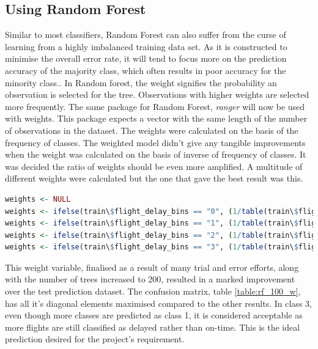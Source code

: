 \subsection{Using Random Forest}
Similar to most classifiers, Random Forest can also suffer from the curse of learning from a highly imbalanced training data set. As it is constructed to minimise the overall error rate, it will tend to focus more on the prediction accuracy of the majority class, which often results in poor accuracy for the minority class.\cite{Chen2004UsingDatab}. In Random forest, the weight signifies the probability an observation is selected for the tree. Observations with higher weights are selected more frequently. The same package for Random Forest, \textit{ranger} will now be used with weights. This package expects a vector with the same length of the number of observations in the dataset. The weights were calculated on the basis of the frequency of classes. The weighted model didn't give any tangible improvements when the weight was calculated on the basis of inverse of frequency of classes. It was decided the ratio of weights should be even more amplified. A multitude of different weights were calculated but the one that gave the best result was this. 
    
\begin{lstlisting}[language=R, breaklines=true]
weights <- NULL
weights <- ifelse(train\$flight_delay_bins == "0", (1/table(train\$flight_delay_bins)[1]) * 0.10, 0)
weights <- ifelse(train\$flight_delay_bins == "1", (1/table(train\$flight_delay_bins)[2]) * 0.20, weights)
weights <- ifelse(train\$flight_delay_bins == "2", (1/table(train\$flight_delay_bins)[3]) * 0.30 , weights)
weights <- ifelse(train\$flight_delay_bins == "3", (1/table(train\$flight_delay_bins)[4]) * 0.40, weights)
\end{lstlisting}

This weight variable, finalised as a result of many trial and error efforts, along with the number of trees increased to 200, resulted in a marked improvement over the test prediction dataset. The confusion matrix, table \ref{table:rf_100_w}, has all it's diagonal elements maximised compared to the other results. In class 3, even though more classes are predicted as class 1, it is considered acceptable as more flights are still classified as delayed rather than on-time. This is the ideal prediction desired for the project's requirement.


